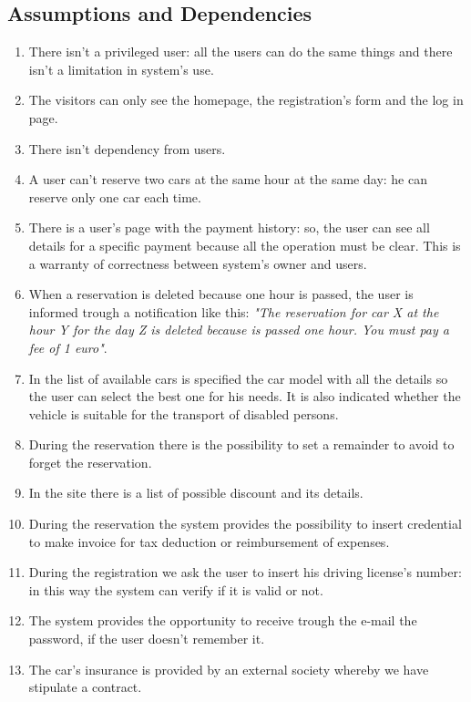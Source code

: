 \subsection{Assumptions and Dependencies} \label{subsec:dependencies}
\begin{enumerate}
\item There isn't a privileged user: all the users can do the same things and there isn't a limitation in system's use.
\item The visitors can only see the homepage, the registration's form and the log in page.
\item There isn't dependency from users.
\item A user can't reserve two cars at the same hour at the same day: he can reserve only one car each time.
\item There is a user's page with the payment history: so, the user can see all details for a specific payment because all the operation must be clear. This is a warranty of correctness between system's owner and users.
\item When a reservation is deleted because one hour is passed, the user is informed trough a notification like this: \emph{"The reservation for car X at the hour Y for the day Z is deleted because is passed one hour. You must pay a fee of 1 euro"}.
\item In the list of available cars is specified the car model with all the details so the user can select the best one for his needs. It is also indicated whether the vehicle is suitable for the transport of disabled persons.
\item During the reservation there is the possibility to set a remainder to avoid to forget the reservation.
\item In the site there is a list of possible discount and its details.
\item During the reservation the system provides the possibility to insert credential to make invoice 
for tax deduction or reimbursement of expenses.
\item During the registration we ask the user to insert his driving license's number: in this way the system can verify if it is valid or not.
\item The system provides the opportunity to receive trough the e-mail the password, if the user doesn't remember it.
\item The car's insurance is provided by an external society whereby we have stipulate a contract.
\end{enumerate}

